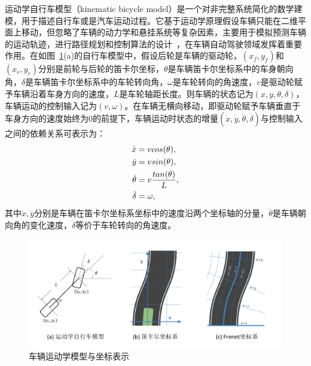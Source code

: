 运动学自行车模型（kinematic bicycle model）是一个对非完整系统简化的数学建模，用于描述自行车或是汽车运动过程。它基于运动学原理假设车辆只能在二维平面上移动，但忽略了车辆的动力学和悬挂系统等复杂因素，主要用于模拟预测车辆的运动轨迹，进行路径规划和控制算法的设计~\cite{d1991modelling, kanayama1991stable, kong2015kinematic, polack2017kinematic, freire2022optimal}，在车辆自动驾驶领域发挥着重要作用。在如图~\ref{fig:intro_bicycle&frenet}(a)的自行车模型中，假设后轮是车辆的驱动轮，$(x_f, y_f)$和$(x_r, y_r)$分别是前轮与后轮的笛卡尔坐标，$\theta$是车辆笛卡尔坐标系中的车身朝向角，$\delta$是车辆笛卡尔坐标系中的车轮转向角，$\omega$是车轮转向的角速度，$v$是驱动轮赋予车辆沿着车身方向的速度，$L$是车轮轴距长度。则车辆的状态记为$(x, y, \theta, \delta)$，车辆运动的控制输入记为$(v, \omega)$。在车辆无横向移动，即驱动轮赋予车辆垂直于车身方向的速度始终为0的前提下，车辆运动时状态的增量$(\dot{x}, \dot{y}, \dot{\theta}, \dot{\delta})$与控制输入之间的依赖关系可表示为：%
\begin{equation}
\setlength\abovedisplayskip{10pt}
\setlength\belowdisplayskip{10pt}
\begin{aligned}
    \dot{x} &= vcos(\theta), \\
    \dot{y} &= vsin(\theta), \\
    \dot{\theta} &= v\frac{tan(\theta)}{L}, \\
    \dot{\delta} &= \omega,
\end{aligned}
\label{eq:intro_bicycle1}
\end{equation}
其中$\dot{x}, \dot{y}$分别是车辆在笛卡尔坐标系坐标中的速度沿两个坐标轴的分量，$\dot{\theta}$是车辆朝向角的变化速度，$\dot{\delta}$等价于车轮转向的角速度。

\begin{figure}[!tbh]
\centering
\includegraphics[width=\textwidth]{figure/intro/bicycle & frenet v2.pdf}
\caption[车辆运动学模型与坐标表示]{
车辆运动学模型与坐标表示
}
\label{fig:intro_bicycle&frenet}
\end{figure}

